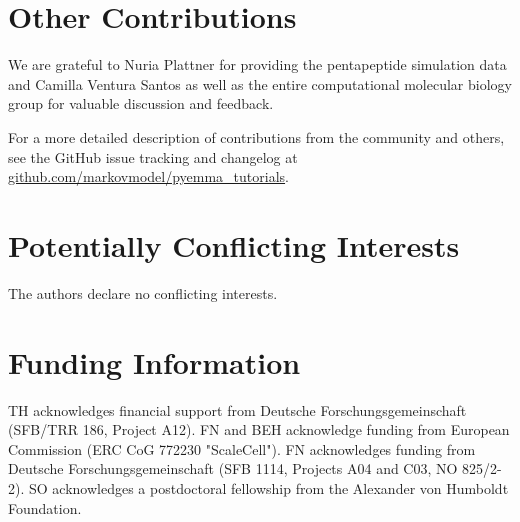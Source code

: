 \documentclass[9pt,tutorial]{livecoms}
\newcommand{\githubrepository}{\url{github.com/markovmodel/pyemma_tutorials}}
\begin{document}
\section{Other Contributions}
%
We are grateful to Nuria Plattner for providing the pentapeptide simulation data and Camilla Ventura Santos as well as the entire computational molecular biology group for valuable discussion and feedback.

For a more detailed description of contributions from the community and others, see the GitHub issue tracking and changelog at \githubrepository{}.

\section{Potentially Conflicting Interests}
The authors declare no conflicting interests.

\section{Funding Information}
TH acknowledges financial support from Deutsche Forschungsgemeinschaft (SFB/TRR 186, Project A12).
FN and BEH acknowledge funding from European Commission (ERC CoG 772230 "ScaleCell").
FN acknowledges funding from Deutsche Forschungsgemeinschaft (SFB 1114, Projects A04 and C03, NO 825/2-2).
SO acknowledges a postdoctoral fellowship from the Alexander von Humboldt Foundation.




\end{document}
